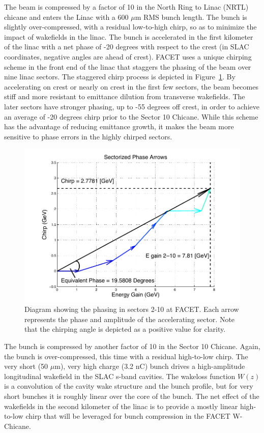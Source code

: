 \documentclass[%
twocolumn,
showpacs,preprintnumbers,
 aps,
prstab,
]{revtex4-1}
\begin{document}
The beam is compressed by a factor of 10 in the North Ring to Linac (NRTL) chicane and enters the Linac with a 600 $\mu$m RMS bunch length. The bunch is slightly over-compressed, with a residual low-to-high chirp, so as to minimize the impact of wakefields in the linac. The bunch is accelerated in the first kilometer of the linac with a net phase of -20 degrees with respect to the crest (in SLAC coordinates, negative angles are ahead of crest). FACET uses a unique chirping scheme in the front end of the linac that staggers the phasing of the beam over nine linac sectors. The staggered chirp process is depicted in Figure~\ref{stag}. By accelerating on crest or nearly on crest in the first few sectors, the beam becomes stiff and more resistant to emittance dilution from transverse wakefields. The later sectors have stronger phasing, up to -55 degrees off crest, in order to achieve an average of -20 degrees chirp prior to the Sector 10 Chicane. While this scheme has the advantage of reducing emittance growth, it makes the beam more sensitive to phase errors in the highly chirped sectors.

\begin{figure}[hb]
  \includegraphics[width=\columnwidth]{figures/stag.pdf}
  \caption{Diagram showing the phasing in sectors 2-10 at FACET. Each arrow represents the phase and amplitude of the accelerating sector. Note that the chirping angle is depicted as a positive value for clarity.}
  \label{stag}
\end{figure}

The bunch is compressed by another factor of 10 in the Sector 10 Chicane. Again, the bunch is over-compressed, this time with a residual high-to-low chirp. The very short (50 $\mu$m), very high charge (3.2 nC) bunch drives a high-amplitude longitudinal wakefield in the SLAC s-band cavities. The wakeloss function $W(z)$ is a convolution of the cavity wake structure and the bunch profile, but for very short bunches it is roughly linear over the core of the bunch. The net effect of the wakefields in the second kilometer of the linac is to provide a mostly linear high-to-low chirp that will be leveraged for bunch compression in the FACET W-Chicane.
\end{document}
